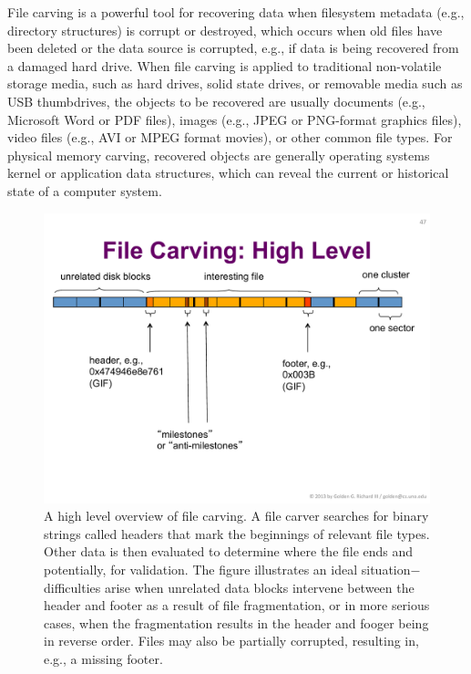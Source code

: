 File carving is a powerful tool for recovering data when filesystem
metadata (e.g., directory structures) is corrupt or destroyed, which
occurs when old files have been deleted or the data source is
corrupted, e.g., if data is being recovered from a damaged hard drive.
When file carving is applied to traditional non-volatile storage
media, such as hard drives, solid state drives, or removable media
such as USB thumbdrives, the objects to be recovered are usually
documents (e.g., Microsoft Word or PDF files), images (e.g., JPEG or
PNG-format graphics files), video files (e.g., AVI or MPEG format
movies), or other common file types.  For physical memory carving,
recovered objects are generally operating systems kernel or
application data structures, which can reveal the current or
historical state of a computer system.


\begin{figure}[ht]
\begin{center}
\includegraphics[width=140mm]{ch-carving/carvingoverview.pdf}
\end{center}
\caption{A high level overview of file carving.  A file carver
  searches for binary strings called headers that mark the beginnings
  of relevant file types.  Other data is then evaluated to determine
  where the file ends and potentially, for validation.  The figure
  illustrates an ideal situation$-$difficulties arise when unrelated
  data blocks intervene between the header and footer as a result of
  file fragmentation, or in more serious cases, when the fragmentation
  results in the header and fooger being in reverse order.  Files may
  also be partially corrupted, resulting in, e.g., a missing footer.} 
\label{fig:carvingoverview}
\end{figure}

